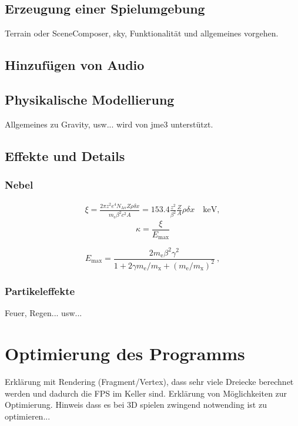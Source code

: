 \subsection{Erzeugung einer Spielumgebung}
Terrain oder SceneComposer, sky, 
Funktionalität und allgemeines vorgehen.

\subsection{Hinzufügen von Audio}

\subsection{Physikalische Modellierung}
Allgemeines zu Gravity, usw... wird von jme3 unterstützt.

\subsection{Effekte und Details}

\subsubsection{Nebel}
\begin{eqnarray*} \xi  = \frac{2\pi z^2 e^4 N_{\textrm{Av}} Z \rho
		\delta x}{m_{\textrm{e}} \beta^2 c^2 A} =  153.4 \frac{z^2}{\beta^2}
	\frac{Z}{A}
	\rho \delta x \quad\textrm{keV},
\end{eqnarray*}
\bigskip
\begin{equation}
\kappa =\frac{\xi}{E_{\textrm{max}}} %
\end{equation}


\[
E_{\textrm{max}} =\frac{2 m_{\textrm{e}} \beta^2\gamma^2 }{1 +
	2\gamma m_{\textrm{e}}/m_{\textrm{x}} + \left ( m_{\textrm{e}}
	/m_{\textrm{x}}\right)^2}\ ,
\]

\subsubsection{Partikeleffekte}
Feuer, Regen... usw...


\section{Optimierung des Programms}\label{sec:optimizing}
Erklärung mit Rendering (Fragment/Vertex), dass sehr viele Dreiecke berechnet werden und dadurch die FPS im Keller sind. Erklärung von Möglichkeiten zur Optimierung.
Hinweis dass es bei 3D spielen zwingend notwending ist zu optimieren...

